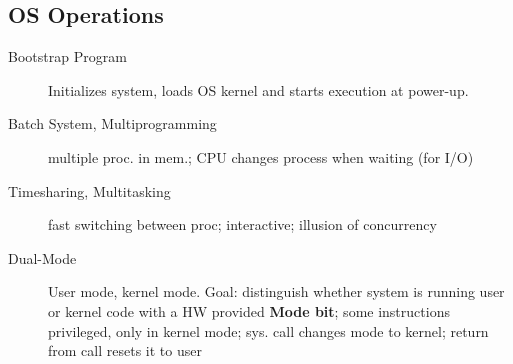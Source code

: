 \subsection*{OS Operations}
\begin{description}
  \item[Bootstrap Program] Initializes system, loads OS kernel and starts execution at power-up.
  \item[Batch System, Multiprogramming] multiple proc. in mem.; CPU changes process when waiting (for I/O)
  \item[Timesharing, Multitasking]  fast switching between proc; interactive; illusion of concurrency
  \item[Dual-Mode] User mode, kernel mode. Goal: distinguish whether system is running user or kernel code with a HW provided \textbf{Mode bit}; some instructions
privileged, only in kernel mode; sys. call changes mode to kernel; return from call resets it to user
\end{description}
